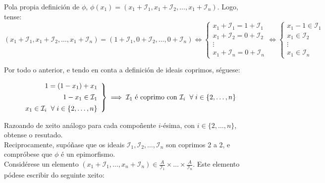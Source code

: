 \documentclass[twoside]{report}
\theoremstyle{mystyle}
\begin{document}
\noindent Pola propia definición de $\phi$, $\phi(x_{1}) = (x_{1} + \mathcal{I}_{1}, x_{1} + \mathcal{I}_{2}, \ldots, x_{1} + \mathcal{I}_{n})$. Logo, tense:
$$(x_{1} + \mathcal{I}_{1}, x_{1} + \mathcal{I}_{2}, \ldots, x_{1} + \mathcal{I}_{n}) = (1 + \mathcal{I}_{1}, 0 + \mathcal{I}_{2}, \ldots, 0 + \mathcal{I}_{n}) \Longleftrightarrow 
\begin{cases}
x_{1} + \mathcal{I}_{1} = 1 + \mathcal{I}_{1}\\
x_{1} + \mathcal{I}_{2} = 0 + \mathcal{I}_{2}\\
\vdots\\
x_{1} + \mathcal{I}_{n} = 0 + \mathcal{I}_{n}
\end{cases}
\Longleftrightarrow
\begin{cases}
x_{1} - 1 \in \mathcal{I}_{1}\\
x_{1} \in \mathcal{I}_{2}\\
\vdots\\
x_{1} \in \mathcal{I}_{n}
\end{cases}
$$

\noindent Por todo o anterior, e tendo en conta a definición de ideais coprimos, séguese:

\[ 
\left. \begin{array}{r} 
1 = (1 - x_{1}) + x_{1}\\[1ex]
1 - x_{1} \in \mathcal{I}_{1}\\[1ex]
x_{1} \in \mathcal{I}_{i} \hspace{2mm} \forall \hspace{1mm} i \in \{2, \ldots, n\}
\end{array} \right\} 
\implies \mathcal{I}_{1} \text{ é coprimo con } \mathcal{I}_{i} \hspace{2mm} \forall \hspace{1mm} i \in \{2, \ldots, n\}
\]

\vspace{2mm}

\noindent Razoando de xeito análogo para cada compoñente $i$-ésima, con $i \in \{2, \ldots, n\}$, obtense o resutado.\\

\noindent {} Reciprocamente, supóñase que os ideais $\mathcal{I}_{1}, \mathcal{I}_{2}, \ldots, \mathcal{I}_{n}$ son coprimos 2 a 2, e compróbese que $\phi$ é un epimorfismo.\\

\noindent Considérese un elemento $(x_{1} + \mathcal{I}_{1}, \ldots, x_{n} + \mathcal{I}_{n}) \in \displaystyle \frac{A}{\mathcal{I}_{1}} \times \ldots \times \displaystyle \frac{A}{\mathcal{I}_{n}}$. Este elemento pódese escribir do seguinte xeito:
\end{document}
